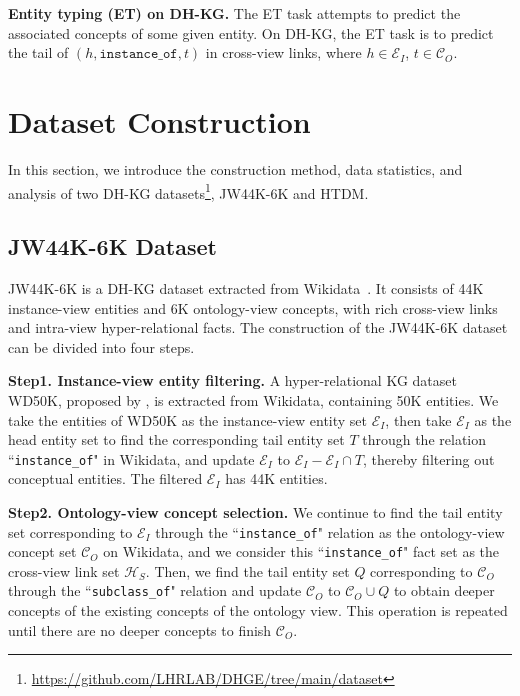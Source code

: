 \documentclass[letterpaper]{article} \usepackage{aaai23}  \usepackage{times}  \usepackage{helvet}  \usepackage{courier}  \usepackage[hyphens]{url}  \usepackage{graphicx} \urlstyle{rm} \def\UrlFont{\rm}  \usepackage{natbib}  \usepackage{caption} \frenchspacing  \setlength{\pdfpagewidth}{8.5in}  \setlength{\pdfpageheight}{11in}  \usepackage{times}
\begin{document}
\textbf{Entity typing (ET) on DH-KG.} The ET task attempts to predict the associated concepts of some given entity. On DH-KG, the ET task is to predict the tail of $(h,\texttt{instance\_of},t)$ in cross-view links, where $h\in\mathcal{E}_I$, $t\in\mathcal{C}_O$.






\section{Dataset Construction}
\label{s4}
In this section, we introduce the construction method, data statistics, and analysis of two DH-KG datasets\footnote{\url{https://github.com/LHRLAB/DHGE/tree/main/dataset}}, JW44K-6K and HTDM.

\subsection{JW44K-6K Dataset}
JW44K-6K is a DH-KG dataset extracted from Wikidata~\citep{Wikidata}. It consists of 44K instance-view entities and 6K ontology-view concepts, with rich cross-view links and intra-view hyper-relational facts. The construction of the JW44K-6K dataset can be divided into four steps.

\textbf{Step1. Instance-view entity filtering.} 
A hyper-relational KG dataset WD50K, proposed by \citealp{StarE}, is extracted from Wikidata, containing 50K entities. We take the entities of WD50K as the instance-view entity set $\mathcal{E}_I$, then take $\mathcal{E}_I$ as the head entity set to find the corresponding tail entity set $T$ through the relation ``\texttt{instance\_of}" in Wikidata, and update $\mathcal{E}_I$ to $\mathcal{E}_I-\mathcal{E}_I \cap T$, thereby filtering out conceptual entities. The filtered $\mathcal{E}_I$ has 44K entities.

\textbf{Step2. Ontology-view concept selection.} 
We continue to find the tail entity set corresponding to $\mathcal{E}_I$ through the ``\texttt{instance\_of}" relation as the ontology-view concept set $\mathcal{C}_O$ on Wikidata, and we consider this ``\texttt{instance\_of}" fact set as the cross-view link set $\mathcal{H}_S$. Then, we find the tail entity set $Q$ corresponding to $\mathcal{C}_O$ through the ``\texttt{subclass\_of}" relation and update $\mathcal{C}_O$ to $\mathcal{C}_O\cup Q$ to obtain deeper concepts of the existing concepts of the ontology view. This operation is repeated until there are no deeper concepts to finish $\mathcal{C}_O$. 
\end{document}
